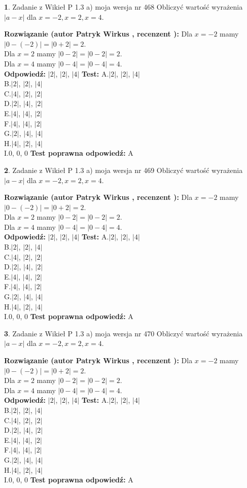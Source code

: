 \documentclass[12pt, a4paper]{article}
\theoremstyle{definition} %
\newtheorem{zad}{}
\newcommand{\zadStart}[1]{\begin{zad}#1\newline}
\newcommand{\zadStop}{\end{zad}}
\newcommand{\rozwStart}[2]{\noindent \textbf{Rozwiązanie (autor #1 , recenzent #2): }\newline}
\newcommand{\rozwStop}{\newline}
\newcommand{\odpStart}{\noindent \textbf{Odpowiedź:}\newline}
\newcommand{\odpStop}{\newline}
\newcommand{\testStart}{\noindent \textbf{Test:}\newline}
\newcommand{\testStop}{\newline}
\newcommand{\kluczStart}{\noindent \textbf{Test poprawna odpowiedź:}\newline}
\newcommand{\kluczStop}{\newline}
\begin{document}
\zadStart{Zadanie z Wikieł P 1.3 a) moja wersja nr 468}
Obliczyć wartość wyrażenia $|a - x|$ dla $x=-2,x=2,x=4$.
\zadStop
\rozwStart{Patryk Wirkus}{}
Dla $x = -2$ mamy $|0 - (-2)| = |0 + 2| = 2$.\\
Dla $x = 2$ mamy $|0 - 2| = |0 - 2| = 2$.\\
Dla $x = 4$ mamy $|0 - 4| = |0 - 4| = 4$.\\
\rozwStop
\odpStart
$|2|$, $|2|$, $|4|$
\odpStop
\testStart
A.$|2|$, $|2|$, $|4|$\\
B.$|2|$, $|2|$, $|4|$\\
C.$|4|$, $|2|$, $|2|$\\
D.$|2|$, $|4|$, $|2|$\\
E.$|4|$, $|4|$, $|2|$\\
F.$|4|$, $|4|$, $|2|$\\
G.$|2|$, $|4|$, $|4|$\\
H.$|4|$, $|2|$, $|4|$\\
I.$0$, $0$, $0$
\testStop
\kluczStart
A
\kluczStop



\zadStart{Zadanie z Wikieł P 1.3 a) moja wersja nr 469}
Obliczyć wartość wyrażenia $|a - x|$ dla $x=-2,x=2,x=4$.
\zadStop
\rozwStart{Patryk Wirkus}{}
Dla $x = -2$ mamy $|0 - (-2)| = |0 + 2| = 2$.\\
Dla $x = 2$ mamy $|0 - 2| = |0 - 2| = 2$.\\
Dla $x = 4$ mamy $|0 - 4| = |0 - 4| = 4$.\\
\rozwStop
\odpStart
$|2|$, $|2|$, $|4|$
\odpStop
\testStart
A.$|2|$, $|2|$, $|4|$\\
B.$|2|$, $|2|$, $|4|$\\
C.$|4|$, $|2|$, $|2|$\\
D.$|2|$, $|4|$, $|2|$\\
E.$|4|$, $|4|$, $|2|$\\
F.$|4|$, $|4|$, $|2|$\\
G.$|2|$, $|4|$, $|4|$\\
H.$|4|$, $|2|$, $|4|$\\
I.$0$, $0$, $0$
\testStop
\kluczStart
A
\kluczStop



\zadStart{Zadanie z Wikieł P 1.3 a) moja wersja nr 470}
Obliczyć wartość wyrażenia $|a - x|$ dla $x=-2,x=2,x=4$.
\zadStop
\rozwStart{Patryk Wirkus}{}
Dla $x = -2$ mamy $|0 - (-2)| = |0 + 2| = 2$.\\
Dla $x = 2$ mamy $|0 - 2| = |0 - 2| = 2$.\\
Dla $x = 4$ mamy $|0 - 4| = |0 - 4| = 4$.\\
\rozwStop
\odpStart
$|2|$, $|2|$, $|4|$
\odpStop
\testStart
A.$|2|$, $|2|$, $|4|$\\
B.$|2|$, $|2|$, $|4|$\\
C.$|4|$, $|2|$, $|2|$\\
D.$|2|$, $|4|$, $|2|$\\
E.$|4|$, $|4|$, $|2|$\\
F.$|4|$, $|4|$, $|2|$\\
G.$|2|$, $|4|$, $|4|$\\
H.$|4|$, $|2|$, $|4|$\\
I.$0$, $0$, $0$
\testStop
\kluczStart
A
\kluczStop
\end{document}
